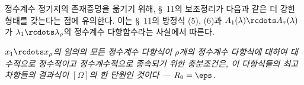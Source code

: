 
정수계수 정기저의 존재증명을 옮기기 위해, \S\ 11의 보조정리가 다음과 같은 더 강한 형태를 갖는다는 점에 유의한다. 이는 \S\ 11의 방정식 (5), (6)과 $A_1(\lambda)\rcdots A_\tau(\lambda)$가 $\lambda_1\rcdots\lambda_\rho$의 정수계수 다항함수라는 사실에서 따른다.

\emph{$x_1\rcdots x_\rho$의 임의의 모든 정수계수 다항식이 $\rho$개의 정수계수 다항식에 대하여 대수적으로 정수적이고 정수계수적으로 종속되기 위한 충분조건은, 이 다항식들의 최고차항들의 결과식이 $[\Omega]$의 한 단원인 것이다 --- $R_0=\eps$.}
